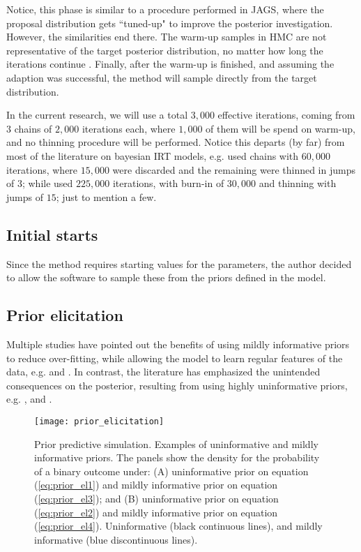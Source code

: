 Notice, this phase is similar to a procedure performed in JAGS, where the proposal distribution gets ``tuned-up" to improve the posterior investigation. However, the similarities end there. The warm-up samples in HMC are not representative of the target posterior distribution, no matter how long the iterations continue \cite{McElreath_2020}. Finally, after the warm-up is finished, and assuming the adaption was successful, the method will sample directly from the target distribution.

In the current research, we will use a total $3,000$ effective iterations, coming from $3$ chains of $2,000$ iterations each, where $1,000$ of them will be spend on warm-up, and no thinning procedure will be performed. Notice this departs (by far) from most of the literature on bayesian IRT models, e.g. \citet{Fujimoto_2018a} used chains with $60,000$ iterations, where $15,000$ were discarded and the remaining were thinned in jumps of $3$; while \citet{Fujimoto_2018b} used $225,000$ iterations, with burn-in of $30,000$ and thinning with jumps of $15$; just to mention a few.



\subsection{Initial starts} \label{sub_sect:starts}

Since the method requires starting values for the parameters, the author decided to allow the software to sample these from the priors defined in the model.



\subsection{Prior elicitation} \label{sub_sect:prior_pred}

Multiple studies have pointed out the benefits of using mildly informative priors to reduce over-fitting, while allowing the model to learn regular features of the data, e.g. \citet{McElreath_2020, Gelman_et_al_1996b} and \citet{Jaynes_1985}. In contrast, the literature has emphasized the unintended consequences on the posterior, resulting from using highly uninformative priors, e.g. \citet{Seaman_et_al_2012}, and \citet{Gelman_1996}.
%
\begin{figure}[!h]
	\centering
	\texttt{[image: prior\_elicitation]}
	\caption[Prior predictive simulation. Examples of uninformative and mildly informative priors.]%
	{Prior predictive simulation. Examples of uninformative and mildly informative priors. The panels show the density for the probability of a binary outcome under: (A) uninformative prior on equation (\ref{eq:prior_el1}) and mildly informative prior on equation (\ref{eq:prior_el3}); and (B) uninformative prior on equation (\ref{eq:prior_el2}) and mildly informative prior on equation (\ref{eq:prior_el4}). Uninformative (black continuous lines), and mildly informative (blue discontinuous lines).}
	\label{fig:prior_elicitation}
\end{figure}

